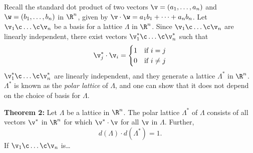 Recall the standard dot product of two vectors $\v=(a_1,\dotsc,a_n)$ and $\w=(b_1,\dotsc,b_n)$ in $\R^n$, given by $\v\cdot \w=a_1b_1+\dotsb+a_nb_n$.  Let $\v_1\c \dotsc\c \v_n$ be a basis for a lattice $\Lambda$ in $\R^n$.  Since $\v_1\c \dotsc\c \v_n$ are linearly independent, there exist vectors $\v^*_1\c \dotsc\c \v^*_n$ such that
\[ \v^*_j \cdot \v_i = \begin{cases}
1 & \text{if $i=j$} \\
0 & \text{if $i\neq j$}
\end{cases} \]
$\v^*_1\c \dotsc\c \v^*_n$ are linearly independent, and they generate a lattice $\Lambda^*$ in $\R^n$.  $\Lambda^*$ is known as the \emph{polar lattice} of $\Lambda$, and one can show that it does not depend on the choice of basis for $\Lambda$.

\textbf{Theorem 2:}  Let $\Lambda$ be a lattice in $\R^n$.  The polar lattice $\Lambda^*$ of $\Lambda$ consists of all vectors $\v^*$ in $\R^n$ for which $\v^*\cdot \v$ for all $\v$ in $\Lambda$.  Further,
\[ d(\Lambda)\cdot d(\Lambda^*) = 1 . \]
\pf If $\v_1\c \dotsc\c \v_n$ is\ldots
